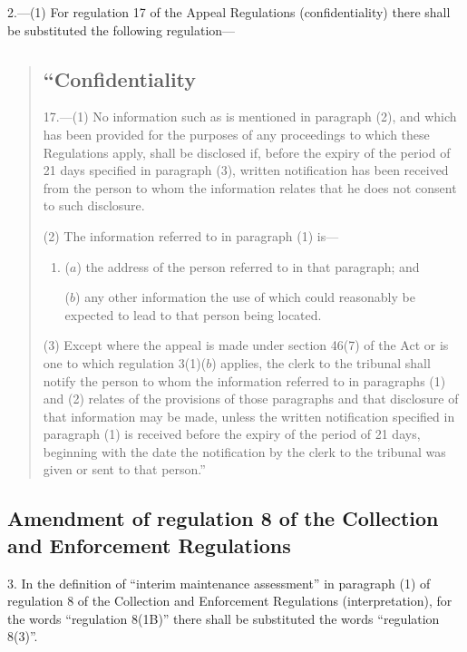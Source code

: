\documentclass[12pt,a4paper]{article}
\begin{document}
2.—(1) For regulation 17 of the Appeal Regulations (confidentiality) there shall be substituted the following regulation—
\begin{quotation}
\subsection*{“Confidentiality}

17.—(1) No information such as is mentioned in paragraph (2), and which has been provided for the purposes of any proceedings to which these Regulations apply, shall be disclosed if, before the expiry of the period of 21 days specified in paragraph (3), written notification has been received from the person to whom the information relates that he does not consent to such disclosure.

(2) The information referred to in paragraph (1) is—
\begin{enumerate}\item[]
($a$) the address of the person referred to in that paragraph; and

($b$) any other information the use of which could reasonably be expected to lead to that person being located.
\end{enumerate}

(3) Except where the appeal is made under section 46(7) of the Act or is one to which regulation 3(1)($b$) applies, the clerk to the tribunal shall notify the person to whom the information referred to in paragraphs (1) and (2) relates of the provisions of those paragraphs and that disclosure of that information may be made, unless the written notification specified in paragraph (1) is received before the expiry of the period of 21 days, beginning with the date the notification by the clerk to the tribunal was given or sent to that person.”
\end{quotation}

\subsection[3. Amendment of regulation 8 of the Collection and Enforcement Regulations]{Amendment of regulation 8 of the Collection and Enforcement Regulations}

3.  In the definition of “interim maintenance assessment” in paragraph (1) of regulation 8 of the Collection and Enforcement Regulations (interpretation), for the words “regulation 8(1B)” there shall be substituted the words “regulation 8(3)”.
\end{document}
